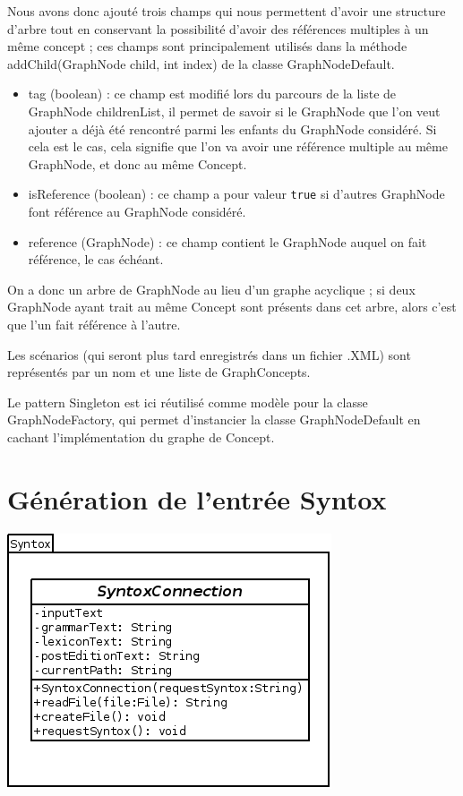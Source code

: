 \documentclass[12pt]{report}
\begin{document}
Nous avons donc ajouté trois champs qui nous permettent d'avoir une structure d'arbre tout en conservant la possibilité d'avoir des références multiples à un même concept ; ces champs sont principalement utilisés dans la méthode addChild(GraphNode child, int index) de la classe GraphNodeDefault.
\begin{itemize}
\item tag (boolean) : ce champ est modifié lors du parcours de la liste de GraphNode childrenList, il permet de savoir si le GraphNode que l'on veut ajouter a déjà été rencontré parmi les enfants du GraphNode considéré. Si cela est le cas, cela signifie que l'on va avoir une référence multiple au même GraphNode, et donc au même Concept.
\item isReference (boolean) : ce champ a pour valeur \texttt{true} si d'autres GraphNode font référence au GraphNode considéré.
\item reference (GraphNode) : ce champ contient le GraphNode auquel on fait référence, le cas échéant.
\end{itemize}

On a donc un arbre de GraphNode au lieu d'un graphe acyclique ; si deux GraphNode ayant trait au même Concept sont présents dans cet arbre, alors c'est que l'un fait référence à l'autre.

\bigskip 
Les scénarios (qui seront plus tard enregistrés dans un fichier .XML) sont représentés par un nom et une liste de GraphConcepts.

\bigskip
Le pattern Singleton est ici réutilisé comme modèle pour la classe GraphNodeFactory, qui permet d'instancier la classe GraphNodeDefault en cachant l'implémentation du graphe de Concept.

\section{Génération de l'entrée Syntox}

\begin{center}
\includegraphics[scale=0.6]{diversuml/SyntoxConnection.png}
\end{center}
\end{document}

